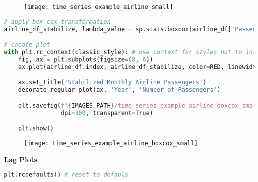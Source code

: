\begin{figure}[h!]
  \centering
  \texttt{[image: time\_series\_example\_airline\_small]}
\end{figure}\newpage


\begin{center}
  \begin{lstlisting}[language=Python, 
  caption={Пассажиры авиалиний (после преобразования Бокса-Кокса).}, 
  label={lst:time_series_example_airline_boxcox_small}]
# apply box cox transformation
airline_df_stabilize, lambda_value = sp.stats.boxcox(airline_df['Passengers'])

# create plot
with plt.rc_context(classic_style): # use context for styles not to interfere
    fig, ax = plt.subplots(figsize=(8, 6))
    ax.plot(airline_df.index, airline_df_stabilize, color=RED, linewidth=1.5)

    ax.set_title('Stabilized Monthly Airline Passengers')
    decorate_regular_plot(ax, 'Year', 'Number of Passengers')

    plt.savefig(f'{IMAGES_PATH}/time_series_example_airline_boxcox_small.png', 
                dpi=300, transparent=True)

    plt.show()
  \end{lstlisting}
\end{center}

\begin{figure}[h!]
  \centering
  \texttt{[image: time\_series\_example\_airline\_boxcox\_small]}
\end{figure}\newpage


\begin{center}
  \noindent\normalsize\bfseries
  Lag Plots
\end{center}\vspace{-17.5pt}

\begin{center}
  \begin{lstlisting}[language=Python]
plt.rcdefaults() # reset to defauls
  \end{lstlisting}
\end{center}

